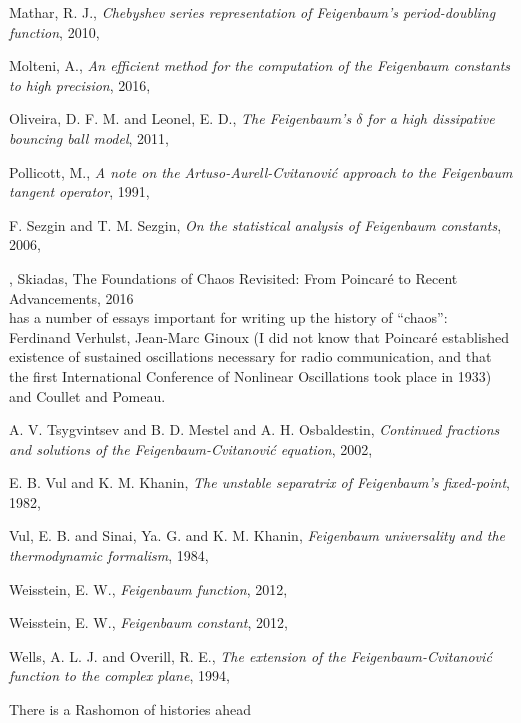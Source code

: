 \begin{description}
{Mathar, R. J.},
{\em {Chebyshev} series representation of {Feigenbaum's} period-doubling function},
{2010},

{Molteni, A.},
{\em An efficient method for the computation of the {Feigenbaum} constants to high precision},
{2016},

{Oliveira, D. F. M. and Leonel, E. D.},
{\em The {Feigenbaum}'s {$\delta$} for a high dissipative bouncing ball model},
{2011},

{Pollicott, M.},
{\em A note on the {Artuso-Aurell-Cvitanovi{\'c}} approach to the {Feigenbaum} tangent operator},
{1991},

{F. Sezgin and T. M. Sezgin},
{\em On the statistical analysis of {Feigenbaum} constants},
{2006},

,
{Skiadas},
{{The Foundations of Chaos Revisited: From Poincar{\'{e}} to Recent Advancements}},
{2016}
\\
has a number of essays important for writing up the history of ``chaos'':
Ferdinand Verhulst, Jean-Marc Ginoux (I did not know that Poincar\'e
established existence of sustained oscillations necessary for radio
communication, and that the first International Conference of Nonlinear
Oscillations took place in 1933) and
Coullet and Pomeau.

{A. V. Tsygvintsev and B. D. Mestel and A. H. Osbaldestin},
{\em Continued fractions and solutions of the {Feigenbaum-Cvitanovi{\'{c}}} equation},
{2002},

{E. B. Vul and K. M. Khanin},
{\em The unstable separatrix of {Feigenbaum}'s fixed-point},
{1982},

{Vul, E. B. and Sinai, Ya. G. and K. M. Khanin},
{\em Feigenbaum universality and the thermodynamic formalism},
{1984},

{Weisstein, E. W.},
{\em Feigenbaum function},
{2012},

{Weisstein, E. W.},
{\em Feigenbaum constant},
{2012},

{Wells, A. L. J. and Overill, R. E.},
{\em The extension of the {Feigenbaum-Cvitanovi{\'c}} function to the complex plane},
{1994},

\end{description}


There is a Rashomon of histories ahead

